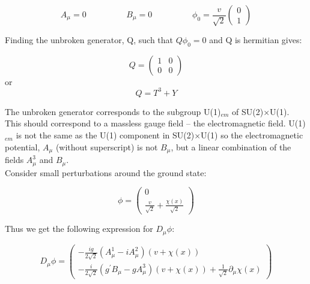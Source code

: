 \begin{equation}
A_{\mu} = 0 \hspace{2cm} B_{\mu} = 0 \hspace{2cm} \phi_{0} =
\frac{v}{\sqrt{2}}\left(\begin{array}{c}0\\1\end{array}\right)
\end{equation}

Finding the unbroken generator, Q, such that $Q\phi_{0} = 0$ and Q is hermitian
gives:

\begin{equation}
Q = \left(\begin{array}{cc}1&0\\0&0\end{array}\right)
\end{equation}
or
\begin{equation}
Q = T^{3} + Y 
\end{equation}

The unbroken generator corresponds to the subgroup U(1)$_{em}$ of
SU(2)$\times$U(1). This should correspond to a massless gauge field -- the
electromagnetic field. U(1)$_{em}$ is not the same as the U(1) component in
SU(2)$\times$U(1) so the electromagnetic potential, $A_{\mu}$ (without
superscript) is not $B_{\mu}$, but a linear combination of the fields
$A_{\mu}^{3}$ and $B_{\mu}$. \\

Consider small perturbations around the ground state:

\begin{equation}
\phi = \left(
\begin{array}{c}
0 \\ 
\frac{v}{\sqrt{2}} + \frac{\chi(x)}{\sqrt{2}}
\end{array}
\right)
\end{equation}

Thus we get the following expression for $D_{\mu}\phi$:

\begin{equation}
D_{\mu}\phi = \left(
\begin{array}{c}
-\frac{ig}{2\sqrt{2}}\left(A_{\mu}^{1} - iA_{\mu}^{2}\right)(v + \chi(x)) \\
-\frac{i}{2\sqrt{2}}\left(g^{\prime}B_{\mu} - gA_{\mu}^{3}\right)(v + \chi(x)) +
\frac{1}{\sqrt{2}}\partial_{\mu}\chi(x)
\end{array}
\right)
\end{equation}

